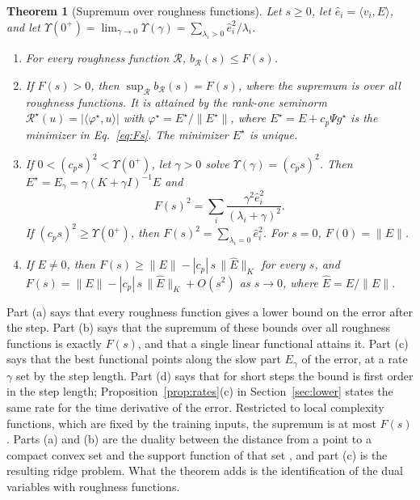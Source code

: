 \documentclass[11pt]{article}
\newtheorem{theorem}{Theorem}
\theoremstyle{definition}
\theoremstyle{remark}
\newcommand{\Rgh}{\mathcal{R}}           %
\newcommand{\ip}[2]{\langle #1,#2\rangle}
\begin{document}
\begin{theorem}[Supremum over roughness functions]\label{thm:stepsup}
Let $s \ge 0$, let $\hat e_i = \ip{v_i}{E}$, and let $\Upsilon(0^+) = \lim_{\gamma\to0}\Upsilon(\gamma) = \sum_{\lambda_i>0}\hat e_i^2/\lambda_i$.
\begin{enumerate}[label=(\alph*)]
\item For every roughness function $\Rgh$, $b_\Rgh(s) \le F(s)$.
\item If $F(s) > 0$, then $\sup_\Rgh b_\Rgh(s) = F(s)$, where the supremum is over all roughness functions. It is attained by the rank-one seminorm $\Rgh^\star(u) = |\ip{\varphi^\star}{u}|$ with $\varphi^\star = E^\star/\|E^\star\|$, where $E^\star = E + c_p\Psi g^\star$ is the minimizer in Eq.~\eqref{eq:Fs}. The minimizer $E^\star$ is unique.
\item If $0 < (c_ps)^2 < \Upsilon(0^+)$, let $\gamma > 0$ solve $\Upsilon(\gamma) = (c_ps)^2$. Then $E^\star = E_\gamma = \gamma(K+\gamma I)^{-1}E$ and
\begin{equation}\label{eq:ridgestep}
F(s)^2 = \sum_i\frac{\gamma^2\hat e_i^2}{(\lambda_i+\gamma)^2}.
\end{equation}
If $(c_ps)^2 \ge \Upsilon(0^+)$, then $F(s)^2 = \sum_{\lambda_i=0}\hat e_i^2$. For $s = 0$, $F(0) = \|E\|$.
\item If $E \neq 0$, then $F(s) \ge \|E\| - |c_p|\,s\,\|\hat E\|_K$ for every $s$, and $F(s) = \|E\| - |c_p|\,s\,\|\hat E\|_K + O(s^2)$ as $s \to 0$, where $\hat E = E/\|E\|$.
\end{enumerate}
\end{theorem}

Part (a) says that every roughness function gives a lower bound on the error after the step.
Part (b) says that the supremum of these bounds over all roughness functions is exactly $F(s)$, and that a single linear functional attains it.
Part (c) says that the best functional points along the slow part $E_\gamma$ of the error, at a rate $\gamma$ set by the step length.
Part (d) says that for short steps the bound is first order in the step length; Proposition~\ref{prop:rates}(c) in Section~\ref{sec:lower} states the same rate for the time derivative of the error.
Restricted to local complexity functions, which are fixed by the training inputs, the supremum is at most $F(s)$.
Parts (a) and (b) are the duality between the distance from a point to a compact convex set and the support function of that set \cite{hiriart2001}, and part (c) is the resulting ridge problem.
What the theorem adds is the identification of the dual variables with roughness functions.
\end{document}
